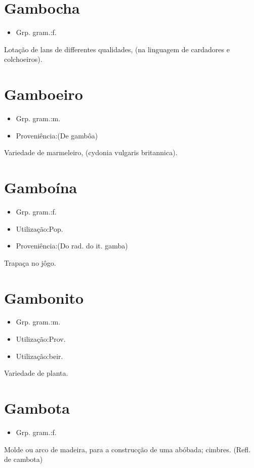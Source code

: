 \section{Gambocha}
\begin{itemize}
\item {Grp. gram.:f.}
\end{itemize}
Lotação de lans de differentes qualidades, (na linguagem de cardadores e colchoeiros).
\section{Gamboeiro}
\begin{itemize}
\item {Grp. gram.:m.}
\end{itemize}
\begin{itemize}
\item {Proveniência:(De \textunderscore gambôa\textunderscore )}
\end{itemize}
Variedade de marmeleiro, (\textunderscore cydonia vulgaris britannica\textunderscore ).
\section{Gamboína}
\begin{itemize}
\item {Grp. gram.:f.}
\end{itemize}
\begin{itemize}
\item {Utilização:Pop.}
\end{itemize}
\begin{itemize}
\item {Proveniência:(Do rad. do it. \textunderscore gamba\textunderscore )}
\end{itemize}
Trapaça no jôgo.
\section{Gambonito}
\begin{itemize}
\item {Grp. gram.:m.}
\end{itemize}
\begin{itemize}
\item {Utilização:Prov.}
\end{itemize}
\begin{itemize}
\item {Utilização:beir.}
\end{itemize}
Variedade de planta.
\section{Gambota}
\begin{itemize}
\item {Grp. gram.:f.}
\end{itemize}
Molde ou arco de madeira, para a construcção de uma abóbada; cimbres.
(Refl. de \textunderscore cambota\textunderscore )
